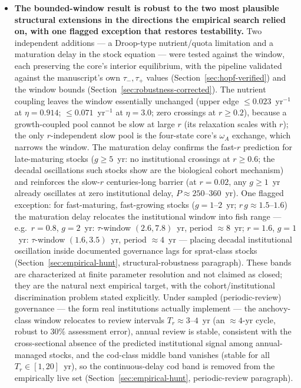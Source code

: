 \documentclass[twocolumn,10pt]{article}
\begin{document}
\begin{itemize}
\item \textbf{The bounded-window result is robust to the two most plausible structural extensions in the directions the empirical search relied on, with one flagged exception that restores testability.} Two independent additions --- a Droop-type nutrient/quota limitation and a maturation delay in the stock equation --- were tested against the window, each preserving the core's interior equilibrium, with the pipeline validated against the manuscript's own $\tau_-,\tau_+$ values (Section~\ref{sec:hopf-verified}) and the window bounds (Section~\ref{sec:robustness-corrected}). The nutrient coupling leaves the window essentially unchanged (upper edge $\le0.023$~yr$^{-1}$ at $\eta=0.914$; $\le0.071$~yr$^{-1}$ at $\eta=3.0$; zero crossings at $r\ge0.2$), because a growth-coupled pool cannot be slow at large $r$ (its relaxation scales with $r$); the only $r$-independent slow pool is the four-state core's $\omega_A$ exchange, which narrows the window. The maturation delay confirms the fast-$r$ prediction for late-maturing stocks ($g\ge5$~yr: no institutional crossings at $r\ge0.6$; the decadal oscillations such stocks show are the biological cohort mechanism) and reinforces the slow-$r$ centuries-long barrier (at $r=0.02$, any $g\ge1$~yr already oscillates at zero institutional delay, $P\approx250$--$360$~yr). One flagged exception: for fast-maturing, fast-growing stocks ($g=1$--$2$~yr; $r\,g\approx1.5$--$1.6$) the maturation delay relocates the institutional window into fish range --- e.g.\ $r=0.8$, $g=2$~yr: $\tau$-window $(2.6,7.8)$~yr, period $\approx8$~yr; $r=1.6$, $g=1$~yr: $\tau$-window $(1.6,3.5)$~yr, period $\approx4$~yr --- placing decadal institutional oscillation inside documented governance lags for sprat-class stocks (Section~\ref{sec:empirical-hunt}, structural-robustness paragraph). These bands are characterized at finite parameter resolution and not claimed as closed; they are the natural next empirical target, with the cohort/institutional discrimination problem stated explicitly. Under sampled (periodic-review) governance --- the form real institutions actually implement --- the anchovy-class window relocates to review intervals $T_r\approx3$--$4$~yr (an $\approx4$-yr cycle, robust to $30\%$ assessment error), annual review is stable, consistent with the cross-sectional absence of the predicted institutional signal among annual-managed stocks, and the cod-class middle band vanishes (stable for all $T_r\in[1,20]$~yr), so the continuous-delay cod band is removed from the empirically live set (Section~\ref{sec:empirical-hunt}, periodic-review paragraph).

\end{itemize}
\end{document}

